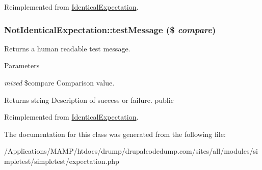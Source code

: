 Reimplemented from \hyperlink{class_identical_expectation_a6076cd232c16294ca0a7979ce11e57da}{IdenticalExpectation}.\hypertarget{class_not_identical_expectation_a4d2927f2f29f63f7cff7e0e24a555d85}{
\subsubsection[{testMessage}]{\setlength{\rightskip}{0pt plus 5cm}NotIdenticalExpectation::testMessage (\$ {\em compare})}}
\label{class_not_identical_expectation_a4d2927f2f29f63f7cff7e0e24a555d85}
Returns a human readable test message. 
\begin{DoxyParams}{Parameters}
\item[{\em mixed}]\$compare Comparison value. \end{DoxyParams}
\begin{DoxyReturn}{Returns}
string Description of success or failure.  public 
\end{DoxyReturn}


Reimplemented from \hyperlink{class_identical_expectation_a80c36b4efb3126695a69d4823ab3122b}{IdenticalExpectation}.

The documentation for this class was generated from the following file:\begin{DoxyCompactItemize}
\item 
/Applications/MAMP/htdocs/drump/drupalcodedump.com/sites/all/modules/simpletest/simpletest/expectation.php\end{DoxyCompactItemize}
